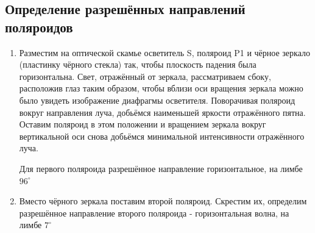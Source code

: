\documentclass[15pt,a5paper,reqno]{article}
\begin{document}
\subsection{Определение разрешённых направлений поляроидов}
\begin{enumerate}
    \item Разместим на оптической скамье осветитель
S, поляроид P1 и чёрное зеркало (пластинку чёрного стекла) так, чтобы плоскость падения была горизонтальна. Свет, отражённый от зеркала, рассматриваем сбоку, расположив глаз таким образом, чтобы вблизи оси вращения зеркала можно было увидеть изображение диафрагмы осветителя.
Поворачивая поляроид вокруг направления луча, добьёмся наименьшей яркости отражённого пятна. Оставим поляроид в этом положении
и вращением зеркала вокруг вертикальной оси снова добьёмся минимальной интенсивности отражённого луча.

\begin{figure}[h!]
\end{figure}

\par Для первого поляроида разрешённое направление горизонтальное, на лимбе $96^{\circ}$
\item Вместо чёрного зеркала поставим второй поляроид. Скрестим их, определим разрешённое направление второго поляроида - горизонтальная волна, на лимбе $7^{\circ}$
\end{enumerate}
\end{document}
